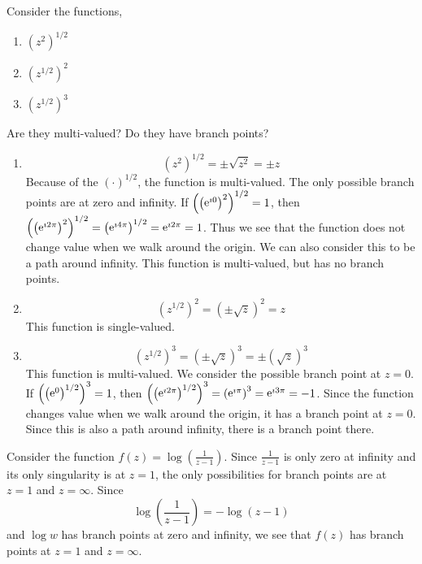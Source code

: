 \begin{Example}
  Consider the functions,
  \begin{enumerate}
  \item $\left( z^2 \right)^{1/2}$
  \item $\left( z^{1/2} \right)^2$
  \item $\left( z^{1/2} \right)^3$
  \end{enumerate}
  Are they multi-valued?  Do they have branch points?

  \begin{enumerate}
  \item
    \[ 
    \left( z^2 \right)^{1/2} = \pm \sqrt{z^2} = \pm z 
    \]
    Because of the $(\cdot)^{1/2}$, the function is multi-valued.  The
    only possible branch points are at zero and infinity.  If
    $\left( \left( \mathop{\mathrm{e}}\nolimits^{\imath 0} \right)^2 \right)^{1/2} = 1$, then 
    $\left( \left(\mathop{\mathrm{e}}\nolimits^{\imath 2 \pi} \right)^2 \right)^{1/2} =
    \left( \mathop{\mathrm{e}}\nolimits^{\imath 4 \pi} \right)^{1/2} = \mathop{\mathrm{e}}\nolimits^{\imath 2 \pi} = 1$.  Thus we see that
    the function does not change value when we walk around the origin.
    We can also consider this to be a path around infinity.  This
    function is multi-valued, but has no branch points.
  \item
    \[ 
    \left( z^{1/2} \right)^2 = \left( \pm \sqrt{z} \right)^2 = z 
    \]
    This function is single-valued.
  \item
    \[ 
    \left( z^{1/2} \right)^3 = \left( \pm \sqrt{z} \right)^3 
    = \pm \left( \sqrt{z} \right)^3 
    \]
    This function is multi-valued.  
    We consider the possible branch point at $z = 0$.  If 
    $\left( \left( \mathop{\mathrm{e}}\nolimits^0 \right)^{1/2} \right)^3 = 1$,
    then $\left( \left( \mathop{\mathrm{e}}\nolimits^{\imath 2 \pi} \right)^{1/2} \right)^3 = \left( \mathop{\mathrm{e}}\nolimits^{\imath \pi} \right)^3 
    = \mathop{\mathrm{e}}\nolimits^{\imath 3 \pi} = -1$.  Since
    the function changes value when we walk around the origin,
    it has a branch point at $z = 0$.  Since this is also a path around 
    infinity, there is a branch point there.
  \end{enumerate}
\end{Example}







\begin{Example}
  Consider the function $f(z) = \log \left( \frac{1}{z-1} \right)$.  Since
  $\frac{1}{z-1}$ is only zero at infinity and its only singularity
  is at $z = 1$, the only possibilities for branch points are at $z = 1$
  and $z = \infty$.  Since
  \[
  \log \left( \frac{1}{z-1} \right) = - \log (z-1)
  \]
  and $\log w$ has branch points at zero and infinity, we see that $f(z)$ 
  has branch points at $z = 1$ and $z = \infty$.
\end{Example}






